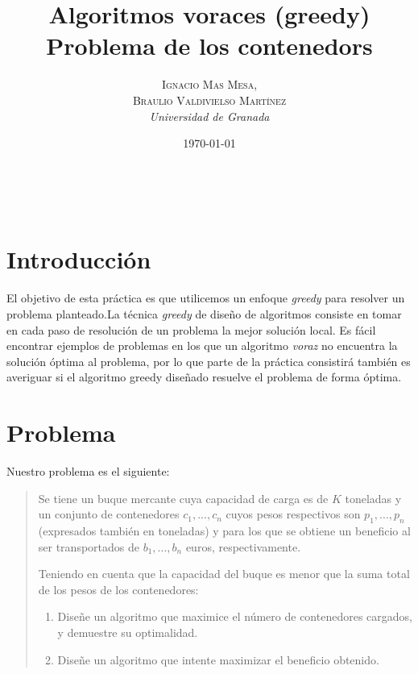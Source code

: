 \documentclass[a4paper, 11pt]{article}
\title{\textbf{Algoritmos voraces (greedy)}\\ %
Problema de los contenedors} %
\author{\textsc{Ignacio Mas Mesa,\\Braulio Valdivielso Martínez} %
\\{\textit{Universidad de Granada}}} %
\date{\today} %
\makeatletter
\renewcommand{\maketitle}{
  \begin{flushright} %
  
  {\LARGE\@title} %
  
  \vspace{50pt} %
  
  {\large\@author} %
  \\\@date %
  \vspace{40pt} %
  \end{flushright}
}
\makeatother
\begin{document}
\maketitle %

\renewcommand{\abstractname}{Resumen} %



{\parskip=2pt
  \tableofcontents
}
\pagebreak


\section{Introducción}
El objetivo de esta práctica es que utilicemos un enfoque \textit{greedy} para resolver un problema planteado.La técnica \textit{greedy} de diseño de algoritmos consiste en tomar en cada paso de resolución de un problema la mejor solución local. Es fácil encontrar ejemplos de problemas en los que un algoritmo \textit{voraz} no encuentra la solución óptima al problema, por lo que parte de la práctica consistirá también es averiguar si el algoritmo greedy diseñado resuelve el problema de forma óptima.

\section{Problema}
Nuestro problema es el siguiente:
\begin{quote}
Se tiene un buque mercante cuya capacidad de carga es de $K$ toneladas y un conjunto de
contenedores $c_1, . . . , c_n$ cuyos pesos respectivos son $p_1, . . . , p_n$ (expresados también en toneladas) y para los que se obtiene un beneficio al ser transportados de $b_1, . . . , b_n$ euros, respectivamente.

Teniendo en cuenta que la capacidad del buque es menor que la suma total de los pesos de los
contenedores:
\begin{enumerate}
\item Diseñe un algoritmo que maximice el número de contenedores cargados, y demuestre su
optimalidad.
\item Diseñe un algoritmo que intente maximizar el beneficio obtenido.
\end{enumerate}
\end{quote}
\end{document}
